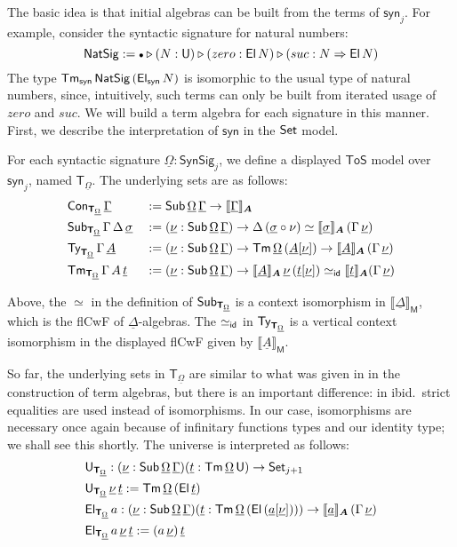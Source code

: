 \documentclass[sigplan,review,anonymous]{acmart}\settopmatter{printfolios=true,printccs=false,printacmref=false}
\newcommand{\ToS}{\mathsf{ToS}}
\newcommand{\ext}{\triangleright}
\newcommand{\emptycon}{\scaleobj{.75}\bullet}
\newcommand{\NatSig}{\mathsf{NatSig}}
\newcommand{\arri}{\Rightarrow}
\newcommand{\syn}{\mathsf{syn}}
\newcommand{\SynSig}{\mathsf{SynSig}}
\newcommand{\bA}{\boldsymbol{A}}
\newcommand{\bM}{\boldsymbol{\mathsf{M}}}
\newcommand{\bT}{\boldsymbol{\mathsf{T}}}
\newcommand{\ul}[1]{\underline{#1}}
\newcommand{\ulGamma}{\ul{\Gamma}}
\newcommand{\ulDelta}{\ul{\Delta}}
\newcommand{\ulOmega}{\ul{\Omega}}
\newcommand{\ulsigma}{\ul{\sigma}}
\newcommand{\ulnu}{\ul{\nu}}
\newcommand{\ult}{\ul{t}}
\newcommand{\ulA}{\ul{A}}
\newcommand{\ula}{\ul{a}}
\newcommand{\llb}{\llbracket}
\newcommand{\rrb}{\rrbracket}
\begin{document}
The basic idea is that initial algebras can be built from the terms of $\syn_j$.
For example, consider the syntactic signature for natural numbers:
\[
\NatSig := \emptycon\ext(N : \U)\ext(zero : \El\,N)\ext (suc : N
\arri \El\,N)
\]
The type $\Tm_{\syn}\,\NatSig\,(\El_{\syn}\,N)$ is isomorphic to the usual type
of natural numbers, since, intuitively, such terms can only be built from
iterated usage of $zero$ and $suc$. We will build a term algebra for each
signature in this manner. First, we describe the interpretation of $\syn$ in the
$\mathsf{Set}$ model.

\begin{definition}
For each syntactic signature $\ulOmega : \SynSig_j$, we define a displayed $\ToS$
model over $\syn_j$, named $\bT_{\ulOmega}$. The underlying sets are as follows:
\begin{alignat*}{3}
  & \Con_{\bT_{\ulOmega}}\,\ulGamma &&:= \Sub\,\ulOmega\,\ulGamma \ra \llb\ulGamma\rrb_{\bA}\\
  & \Sub_{\bT_{\ulOmega}}\,\Gamma\,\Delta\,\ulsigma &&:= (\ulnu : \Sub\,\ulOmega\,\ulGamma)
  \ra \Delta\,(\ulsigma\circ\nu) \simeq \llb\ulsigma\rrb_{\bA}\,(\Gamma\,\ulnu)\\
  & \Ty_{\bT_{\ulOmega}}\,\Gamma\,\ulA &&:= (\ulnu : \Sub\,\ulOmega\,\ulGamma) \ra
    \Tm\,\ulOmega\,(\ulA[\ulnu]) \ra \llb\ulA\rrb_{\bA}\,(\Gamma\,\ulnu)\\
  & \Tm_{\bT_{\ulOmega}}\,\Gamma\,A\,\ult &&:= (\ulnu : \Sub\,\ulOmega\,\ulGamma)\ra
    \llb\ulA\rrb_{\bA}\,\ulnu\,(\ult[\ulnu]) \simeq_{\id} \llb\ult\rrb_{\bA} (\Gamma\,\ulnu)
\end{alignat*}

Above, the $\simeq$ in the definition of $\Sub_{\bT_{\ulOmega}}$ is a context isomorphism
in $\llb\ulDelta\rrb_{\bM}$, which is the flCwF of $\ulDelta$-algebras. The
$\simeq_{\mathsf{id}}$ in $\Ty_{\bT_{\ulOmega}}$ is a vertical context isomorphism in the displayed
flCwF given by $\llb\ulA\rrb_{\bM}$.

So far, the underlying sets in $\bT_{\ulOmega}$ are similar to what was given in
\cite{kaposi2019constructing} in the construction of term algebras, but there is
an important difference: in ibid.\, strict equalities are used instead of
isomorphisms. In our case, isomorphisms are necessary once again because of
infinitary functions types and our identity type; we shall see this shortly. The
universe is interpreted as follows:
\begin{alignat*}{3}
  & \U_{\bT_{\ulOmega}} : (\ulnu : \Sub\,\ulOmega\,\ulGamma)(\ult : \Tm\,\ulOmega\,\U)\ra
              \Set_{j+1}\\
  & \U_{\bT_{\ulOmega}}\,\ulnu\,\ult := \Tm\,\ulOmega\,(\El\,\ult)\\
  & \El_{\bT_{\ulOmega}}\,a : (\ulnu : \Sub\,\ulOmega\,\ulGamma)
             (\ult : \Tm\,\ulOmega\,(\El\,(\ula[\ulnu])))\ra
              \llb\ula\rrb_{\bA}\,(\Gamma\,\ulnu)\\
  & \El_{\bT_{\ulOmega}}\,a\,\ulnu\,\ult := (a\,\ulnu)\,\ult
\end{alignat*}


\end{definition}
\end{document}
